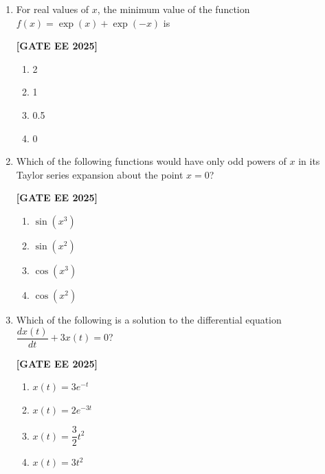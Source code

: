 \documentclass[12pt]{article}
\begin{document}
\begin{enumerate}[leftmargin=2.5em, label=\textbf{Q.\arabic*}., itemsep=2em]
\item For real values of $x$, the minimum value of the function $f(x) = \exp(x) + \exp(-x)$ is
 
\noindent \textbf{[GATE EE 2025]}
\begin{multicols}{4}
    \begin{enumerate}
        \item 2
        \item 1
        \item 0.5
        \item 0
    \end{enumerate}
\end{multicols}

\item Which of the following functions would have only odd powers of $x$ in its Taylor series expansion about the point $x = 0$?
 
\noindent \textbf{[GATE EE 2025]}
\begin{multicols}{4}
    \begin{enumerate}
        \item $\sin(x^3)$
        \item $\sin(x^2)$
        \item $\cos(x^3)$
        \item $\cos(x^2)$
    \end{enumerate}
\end{multicols}

\item Which of the following is a solution to the differential equation $\dfrac{dx(t)}{dt} + 3x(t) = 0$?
 
\noindent \textbf{[GATE EE 2025]}
\begin{multicols}{4}
    \begin{enumerate}
        \item $x(t) = 3e^{-t}$
        \item $x(t) = 2e^{-3t}$
        \item $x(t) = \dfrac{3}{2} t^2$
        \item $x(t) = 3t^2$
    \end{enumerate}
\end{multicols}


\end{enumerate}
\end{document}
